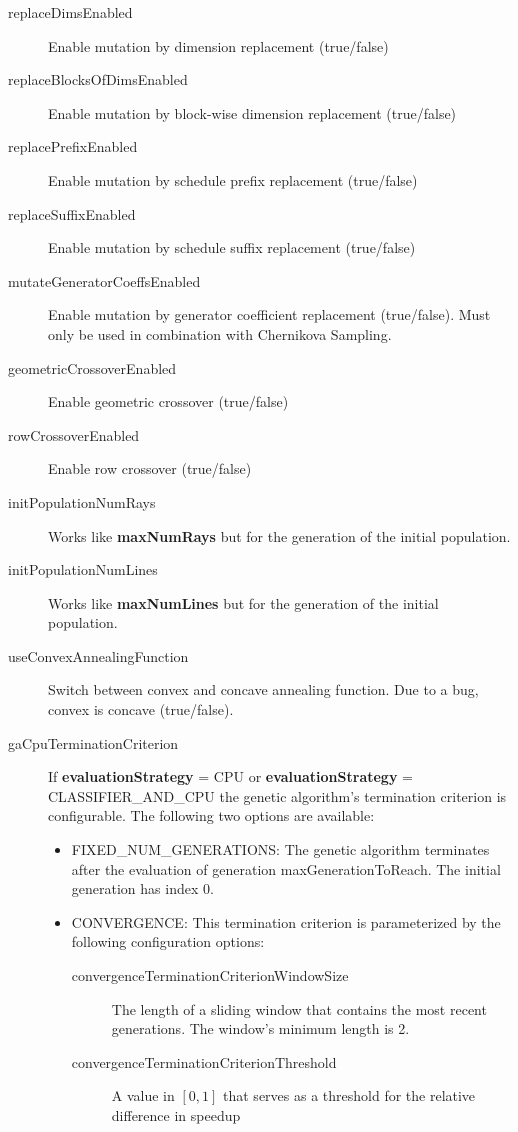 \documentclass{article}
\begin{document}
\begin{description}
  \item[replaceDimsEnabled] Enable mutation by dimension replacement
    (true/false)
  \item[replaceBlocksOfDimsEnabled] Enable mutation by block-wise dimension
    replacement (true/false)
  \item[replacePrefixEnabled] Enable mutation by schedule prefix
    replacement (true/false)
  \item[replaceSuffixEnabled] Enable mutation by schedule suffix
    replacement (true/false)
  \item[mutateGeneratorCoeffsEnabled] Enable mutation by generator
    coefficient replacement (true/false). Must only be used in combination
    with Chernikova Sampling.
  \item[geometricCrossoverEnabled] Enable geometric crossover
    (true/false)
  \item[rowCrossoverEnabled] Enable row crossover (true/false)
  \item[initPopulationNumRays] Works like \textbf{maxNumRays} but for
    the generation of the initial population.
  \item[initPopulationNumLines] Works like \textbf{maxNumLines} but
    for the generation of the initial population.
  \item[useConvexAnnealingFunction] Switch between convex and concave
    annealing function. Due to a bug, convex is concave (true/false).
  \item[gaCpuTerminationCriterion] If \textbf{evaluationStrategy} = CPU or
  \textbf{evaluationStrategy} = CLASSIFIER\_AND\_CPU the genetic algorithm's
  termination criterion is configurable. The following two options are
  available:
  \begin{itemize}
    \item FIXED\_NUM\_GENERATIONS: The genetic algorithm terminates after
      the evaluation of generation \textsf{maxGenerationToReach}. The initial
      generation has index 0.
    \item CONVERGENCE: This termination criterion is parameterized by the
      following configuration options:
      \begin{description}
        \item[convergenceTerminationCriterionWindowSize] The length of a sliding
          window that contains the most recent generations. The window's minimum
          length is 2.
        \item[convergenceTerminationCriterionThreshold] A value in $[0, 1]$
          that serves as a threshold for the relative difference in speedup

\end{description}
\end{itemize}
\end{description}
\end{document}
